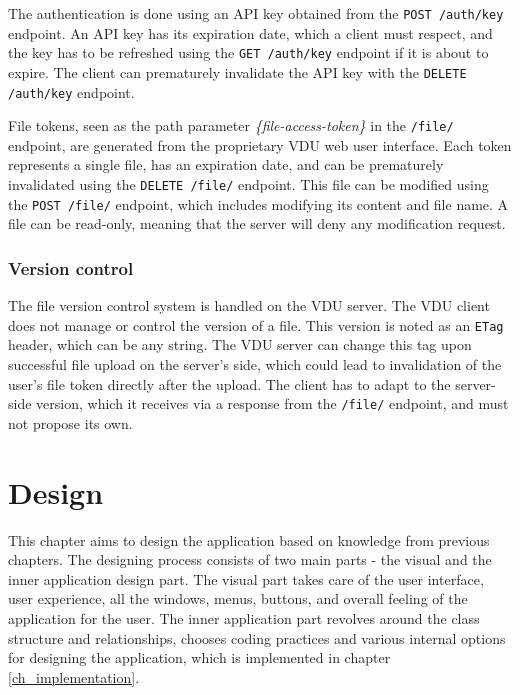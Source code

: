 The authentication is done using an API key obtained from the \lstinline{POST /auth/key} endpoint. An API key has its expiration date, which a client must respect, and the key has to be refreshed using the \lstinline{GET /auth/key} endpoint if it is about to expire. The client can prematurely invalidate the API key with the \lstinline{DELETE /auth/key} endpoint.

File tokens, seen as the path parameter \textit{\{file-access-token\}} in the \lstinline{/file/} endpoint, are generated from the proprietary VDU web user interface. Each token represents a single file, has an expiration date, and can be prematurely invalidated using the \lstinline{DELETE /file/} endpoint. This file can be modified using the \lstinline{POST /file/} endpoint, which includes modifying its content and file name. A file can be read-only, meaning that the server will deny any modification request.

\subsection{Version control}
The file version control system is handled on the VDU server. The VDU client does not manage or control the version of a file. This version is noted as an \lstinline{ETag} header, which can be any string. The VDU server can change this tag upon successful file upload on the server's side, which could lead to invalidation of the user's file token directly after the upload. The client has to adapt to the server-side version, which it receives via a response from the \lstinline{/file/} endpoint, and must not propose its own.


\chapter{Design}
\label{ch_design}
This chapter aims to design the application based on knowledge from previous chapters. The designing process consists of two main parts - the visual and the inner application design part. The visual part takes care of the user interface, user experience, all the windows, menus, buttons, and overall feeling of the application for the user. The inner application part revolves around the class structure and relationships, chooses coding practices and various internal options for designing the application, which is implemented in chapter \ref{ch_implementation}.

